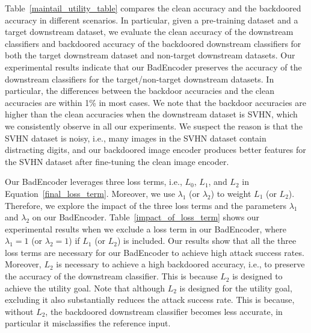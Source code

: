  Table~\ref{maintail_utility_table} compares the clean accuracy and the  backdoored accuracy in different scenarios. In particular, given a pre-training dataset and a target downstream dataset, we evaluate the clean accuracy of the downstream classifiers and  backdoored accuracy of the backdoored downstream classifiers for both the target downstream dataset and non-target downstream datasets. Our experimental results indicate that our BadEncoder preserves the accuracy of the downstream classifiers for the target/non-target downstream datasets. In particular,  
the differences between the backdoor accuracies and the clean accuracies are within 1\% in most cases. We note that the backdoor accuracies are higher than the clean accuracies when the downstream dataset is SVHN, which we consistently observe in all our experiments. We suspect the reason is that the SVHN dataset is noisy, i.e., many images in the SVHN dataset contain distracting digits,  
 and our backdoored image encoder produces better features for the SVHN dataset after fine-tuning the clean image encoder. 




















 Our BadEncoder leverages three loss terms, i.e., $L_0$, $L_1$, and $L_2$ in Equation~\ref{final_loss_term}. Moreover, we use $\lambda_1$ (or $\lambda_2$) to weight $L_1$ (or $L_2$). Therefore, we explore the impact of the three loss terms and the parameters $\lambda_1$ and $\lambda_2$ on our BadEncoder. 
Table~\ref{impact_of_loss_term} shows our experimental results when we exclude a loss term in our BadEncoder, where $\lambda_1=1$ (or $\lambda_2=1$) if $L_1$ (or $L_2$) is included. Our results show that all the three loss terms are necessary for our BadEncoder to achieve high attack success rates. Moreover,  $L_2$ is necessary to achieve a high  backdoored accuracy, i.e., to preserve the accuracy of the downstream classifier. This is because $L_2$ is designed to achieve the utility goal. Note that although $L_2$ is designed for the utility goal, excluding it also substantially reduces the attack success rate. This is because, without $L_2$, the backdoored downstream classifier becomes less accurate, in particular it misclassifies the reference input. 


